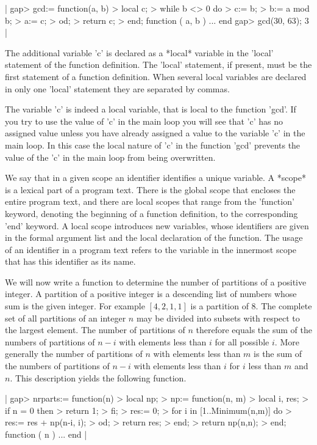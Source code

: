 |    gap> gcd:= function(a, b)
    >       local c;
    >       while b <> 0 do
    >          c:= b;
    >          b:= a mod b;
    >          a:= c;
    >       od;
    >       return c;
    >    end;
    function ( a, b ) ... end
    gap> gcd(30, 63);
    3 |

The additional  variable 'c'  is declared as  a  *local*  variable in the
'local' statement  of the function definition.  The 'local' statement, if
present, must  be the first  statement of  a function  definition.   When
several local variables are  declared in only one  'local' statement they
are separated by commas.

The  variable 'c'  is  indeed  a local  variable,  that  is local to  the
function 'gcd'.  If you try  to use the value of 'c' in the main loop you
will see that 'c'  has no assigned value unless you have already assigned
a value to the variable 'c'  in  the  main loop.  In this case  the local
nature of 'c' in the function 'gcd' prevents  the value of the 'c' in the
main loop from being overwritten.

We say  that in a given scope an identifier identifies a unique variable.
A *scope* is a lexical part of a program text.  There is the global scope
that encloses  the  entire program text, and there are local  scopes that
range from the 'function'  keyword, denoting the beginning of  a function
definition, to the corresponding 'end' keyword.  A local scope introduces
new  variables, whose identifiers are  given in the formal argument  list
and the local declaration of the function.  The usage of an identifier in
a program text refers to  the  variable in  the  innermost scope that has
this identifier as its name.

We will now write  a function to  determine the number of partitions of a
positive integer.  A partition of a positive integer is a descending list
of  numbers whose sum is the given integer.  For example $[4,2,1,1]$ is a
partition of 8.  The complete set of all partitions of an integer $n$ may
be divided into subsets with respect to the largest  element.  The number
of  partitions of  $n$  therefore  equals  the  sum  of  the  numbers  of
partitions  of $n-i$ with  elements less than  $i$ for all possible  $i$.
More generally the  number of partitions of  $n$ with elements  less than
$m$ is the sum  of  the numbers of partitions of $n-i$ with elements less
than  $i$ for $i$ less than  $m$ and  $n$.  This description  yields  the
following function.

|    gap> nrparts:= function(n)
    >    local np;
    >    np:= function(n, m)
    >       local i, res;
    >       if n = 0 then
    >          return 1;
    >       fi;
    >       res:= 0;
    >       for i in [1..Minimum(n,m)] do
    >          res:= res + np(n-i, i);
    >       od;
    >       return res;
    >    end;
    >    return np(n,n);
    > end;
    function ( n ) ... end |

